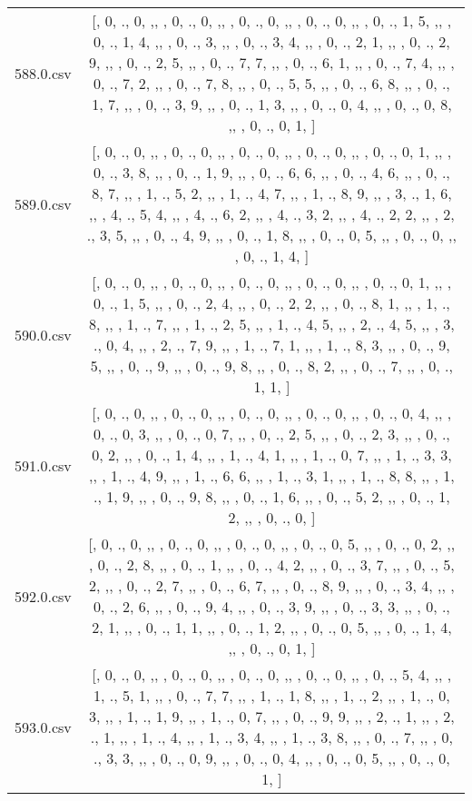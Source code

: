 \begin{table}[ht]
\begin{tabular}{@{}c c@{}}
	588.0.csv & [, 0, ., 0, ,,  , 0, ., 0, ,,  , 0, ., 0, ,,  , 0, ., 0, ,,  , 0, ., 1, 5, ,,  , 0, ., 1, 4, ,,  , 0, ., 3, ,,  , 0, ., 3, 4, ,,  , 0, ., 2, 1, ,,  , 0, ., 2, 9, ,,  , 0, ., 2, 5, ,,  , 0, ., 7, 7, ,,  , 0, ., 6, 1, ,,  , 0, ., 7, 4, ,,  , 0, ., 7, 2, ,,  , 0, ., 7, 8, ,,  , 0, ., 5, 5, ,,  , 0, ., 6, 8, ,,  , 0, ., 1, 7, ,,  , 0, ., 3, 9, ,,  , 0, ., 1, 3, ,,  , 0, ., 0, 4, ,,  , 0, ., 0, 8, ,,  , 0, ., 0, 1, ]\\ 
	589.0.csv & [, 0, ., 0, ,,  , 0, ., 0, ,,  , 0, ., 0, ,,  , 0, ., 0, ,,  , 0, ., 0, 1, ,,  , 0, ., 3, 8, ,,  , 0, ., 1, 9, ,,  , 0, ., 6, 6, ,,  , 0, ., 4, 6, ,,  , 0, ., 8, 7, ,,  , 1, ., 5, 2, ,,  , 1, ., 4, 7, ,,  , 1, ., 8, 9, ,,  , 3, ., 1, 6, ,,  , 4, ., 5, 4, ,,  , 4, ., 6, 2, ,,  , 4, ., 3, 2, ,,  , 4, ., 2, 2, ,,  , 2, ., 3, 5, ,,  , 0, ., 4, 9, ,,  , 0, ., 1, 8, ,,  , 0, ., 0, 5, ,,  , 0, ., 0, ,,  , 0, ., 1, 4, ]\\ 
	590.0.csv & [, 0, ., 0, ,,  , 0, ., 0, ,,  , 0, ., 0, ,,  , 0, ., 0, ,,  , 0, ., 0, 1, ,,  , 0, ., 1, 5, ,,  , 0, ., 2, 4, ,,  , 0, ., 2, 2, ,,  , 0, ., 8, 1, ,,  , 1, ., 8, ,,  , 1, ., 7, ,,  , 1, ., 2, 5, ,,  , 1, ., 4, 5, ,,  , 2, ., 4, 5, ,,  , 3, ., 0, 4, ,,  , 2, ., 7, 9, ,,  , 1, ., 7, 1, ,,  , 1, ., 8, 3, ,,  , 0, ., 9, 5, ,,  , 0, ., 9, ,,  , 0, ., 9, 8, ,,  , 0, ., 8, 2, ,,  , 0, ., 7, ,,  , 0, ., 1, 1, ]\\ 
	591.0.csv & [, 0, ., 0, ,,  , 0, ., 0, ,,  , 0, ., 0, ,,  , 0, ., 0, ,,  , 0, ., 0, 4, ,,  , 0, ., 0, 3, ,,  , 0, ., 0, 7, ,,  , 0, ., 2, 5, ,,  , 0, ., 2, 3, ,,  , 0, ., 0, 2, ,,  , 0, ., 1, 4, ,,  , 1, ., 4, 1, ,,  , 1, ., 0, 7, ,,  , 1, ., 3, 3, ,,  , 1, ., 4, 9, ,,  , 1, ., 6, 6, ,,  , 1, ., 3, 1, ,,  , 1, ., 8, 8, ,,  , 1, ., 1, 9, ,,  , 0, ., 9, 8, ,,  , 0, ., 1, 6, ,,  , 0, ., 5, 2, ,,  , 0, ., 1, 2, ,,  , 0, ., 0, ]\\ 
	592.0.csv & [, 0, ., 0, ,,  , 0, ., 0, ,,  , 0, ., 0, ,,  , 0, ., 0, 5, ,,  , 0, ., 0, 2, ,,  , 0, ., 2, 8, ,,  , 0, ., 1, ,,  , 0, ., 4, 2, ,,  , 0, ., 3, 7, ,,  , 0, ., 5, 2, ,,  , 0, ., 2, 7, ,,  , 0, ., 6, 7, ,,  , 0, ., 8, 9, ,,  , 0, ., 3, 4, ,,  , 0, ., 2, 6, ,,  , 0, ., 9, 4, ,,  , 0, ., 3, 9, ,,  , 0, ., 3, 3, ,,  , 0, ., 2, 1, ,,  , 0, ., 1, 1, ,,  , 0, ., 1, 2, ,,  , 0, ., 0, 5, ,,  , 0, ., 1, 4, ,,  , 0, ., 0, 1, ]\\ 
	593.0.csv & [, 0, ., 0, ,,  , 0, ., 0, ,,  , 0, ., 0, ,,  , 0, ., 0, ,,  , 0, ., 5, 4, ,,  , 1, ., 5, 1, ,,  , 0, ., 7, 7, ,,  , 1, ., 1, 8, ,,  , 1, ., 2, ,,  , 1, ., 0, 3, ,,  , 1, ., 1, 9, ,,  , 1, ., 0, 7, ,,  , 0, ., 9, 9, ,,  , 2, ., 1, ,,  , 2, ., 1, ,,  , 1, ., 4, ,,  , 1, ., 3, 4, ,,  , 1, ., 3, 8, ,,  , 0, ., 7, ,,  , 0, ., 3, 3, ,,  , 0, ., 0, 9, ,,  , 0, ., 0, 4, ,,  , 0, ., 0, 5, ,,  , 0, ., 0, 1, ]\\ 

\end{tabular}
\end{table}
